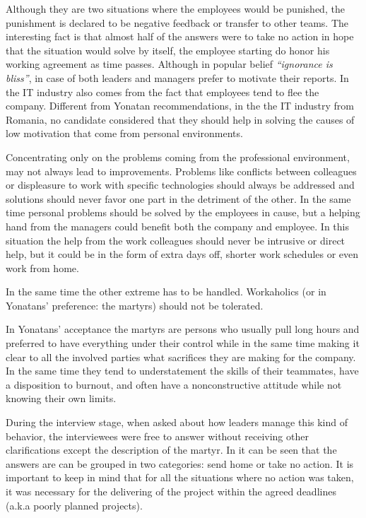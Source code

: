 Although they are two situations where the employees would be punished, the punishment is declared to be negative feedback or transfer to other teams.
The interesting fact is that almost half of the answers were to take no action in hope that the situation would solve by itself, the employee starting do honor his working agreement as time passes.
Although in popular belief \textit{``ignorance is bliss''}, in case of both leaders and managers prefer to motivate their reports. In the IT industry also comes from the fact that employees tend to flee the company. Different from Yonatan recommendations, in the the IT industry from Romania, no candidate considered that they should help in solving the causes of low motivation that come from personal environments. 

Concentrating only on the problems coming from the professional environment, may not always lead to improvements. Problems like conflicts between colleagues or displeasure to work with specific technologies should always be addressed and solutions should never favor one part in the detriment of the other. In the same time personal problems should be solved by the employees in cause, but a helping hand from the managers could benefit both the company and employee. In this situation the help from the work colleagues should never be intrusive or direct help, but it could be in the form of extra days off, shorter work schedules or even work from home.

In the same time the other extreme has to be handled. Workaholics (or in Yonatans' preference: the martyrs) should not be tolerated. 

In Yonatans' acceptance the martyrs are persons who usually pull long hours and preferred to have everything under their control while in the same time making it clear to all the involved parties what sacrifices they are making for the company. In the same time they tend to understatement the skills of their teammates, have a disposition to burnout, and often have a nonconstructive attitude while not knowing their own limits. 

During the interview stage, when asked about how leaders manage this kind of behavior, the interviewees were free to answer without receiving other clarifications except the description of the martyr. In  it can be seen that the answers are can be grouped in two categories: send home or take no action. 
It is important to keep in mind that for all the situations where no action was taken, it was necessary for the delivering of the project within the agreed deadlines (a.k.a poorly planned projects).

